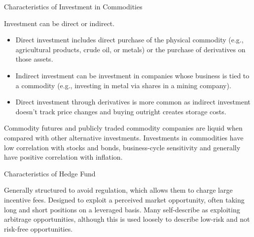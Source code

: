 \documentclass[../custom,grid]{flashcards}
\begin{document}
\begin{flashcard}{Characteristics of Investment in Commodities}
    \begin{flushleft}
        Investment can be direct or indirect.
        \begin{itemize}
            \item Direct investment includes direct purchase of the physical commodity (e.g., agricultural products, crude oil, or metals) or the purchase of derivatives on those assets.
            \item Indirect investment can be investment in companies whose business is tied to a commodity (e.g., investing in metal via shares in a mining company).
            \item Direct investment through derivatives is more common as indirect investment doesn't track price changes and buying outright creates storage costs.
        \end{itemize}
        Commodity futures and publicly traded commodity companies are liquid when compared with other alternative investments. Investments in commodities have low correlation with stocks and bonds, business-cycle sensitivity and generally have positive correlation with inflation.
    \end{flushleft}
\end{flashcard}

\begin{flashcard}{Characteristics of Hedge Fund}
    \begin{flushleft}
        Generally structured to avoid regulation, which allows them to charge large incentive fees. Designed to exploit a perceived market opportunity, often taking long and short positions on a leveraged basis. Many self-describe as exploiting arbitrage opportunities, although this is used loosely to describe low-risk and not risk-free opportunities.
    \end{flushleft}
\end{flashcard}
\end{document}
